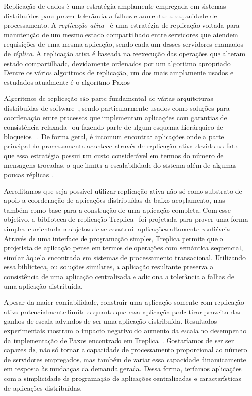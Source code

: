 Replicação de dados é uma estratégia amplamente empregada em sistemas distribuídos para
prover tolerância a falhas e aumentar a capacidade de processamento. A \emph{replicação
ativa}~\cite{schneider90} é uma estratégia de replicação voltada para manutenção de um mesmo
estado compartilhado entre servidores que atendem requisições de uma mesma aplicação,
sendo cada um desses servidores chamados de \emph{réplica}. A replicação ativa é baseada
na reexecução das operações que alteram estado compartilhado, devidamente ordenados por um
algoritmo apropriado~\cite{schneider90}. Dentre os vários algoritmos de replicação, um dos
mais amplamente usados e estudados atualmente é o algoritmo Paxos~\cite{lamport98}.

Algoritmos de replicação são parte fundamental de várias arquiteturas distribuídas de
software~\cite{chandra07,  hupfeld08b, maccormick04}, sendo particularmente usados como
soluções para coordenação entre processos que implementam aplicações com garantias de
consistência relaxada~\cite{burrows06} ou fazendo parte de algum esquema hierárquico de
bloqueios ~\cite{lampson96}. De forma geral, é incomum encontrar aplicações onde a parte
principal do processamento acontece através de replicação ativa devido ao fato que essa
estratégia possui um custo considerável em termos do número de mensagens trocadas, o que
limita a escalabilidade do sistema além de algumas poucas réplicas~\cite{lampson96}.

Acreditamos que seja possível utilizar replicação ativa não só como substrato de apoio a
coordenação de aplicações distribuídas de baixo acoplamento, mas também como base para a
construção de uma aplicação completa. Com esse objetivo, a biblioteca de replicação
Treplica~\cite{vieira08a, vieira-tr10b} foi projetada para prover uma forma simples e
orientada a objetos de se construir aplicações altamente confiáveis. Através de uma
interface de programação simples, Treplica permite que o projetista de aplicação pense em
termos de operações com semântica sequencial, similar àquela encontrada em sistemas de
processamento transacional. Utilizando essa biblioteca, ou soluções similares, a aplicação
resultante preserva a consistência de uma aplicação centralizada e adiciona a tolerância a
falhas de uma aplicação distribuída.

Apesar da maior confiabilidade, construir uma aplicação somente com replicação ativa
potencialmente limita o quanto que essa aplicação pode tirar proveito dos ganhos de escala
advindos de ser uma aplicação distribuída. Resultados experimentais mostram o impacto
negativo do aumento da escala no desempenho da implementação de Paxos encontrado em
Treplica~\cite{vieira09}. Gostaríamos de ser ser capazes de, não só tornar a capacidade de
processamento proporcional ao número de servidores empregados, mas também de variar essa
capacidade dinamicamente em resposta às mudanças da demanda gerada. Dessa forma, teríamos
aplicações com a simplicidade de programação de aplicações centralizadas e características
de aplicações distribuídas.




